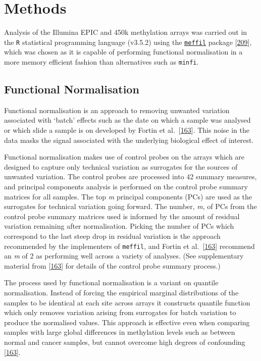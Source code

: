 \documentclass[
]{book}
\begin{document}
\hypertarget{methods-1}{%
\section{Methods}\label{methods-1}}

Analysis of the Illumina EPIC and 450k methylation arrays was carried out in the \texttt{R} statistical programming language (v3.5.2) using the \href{https://github.com/perishky/meffil/wiki}{\texttt{meffil}} package {[}\protect\hyperlink{ref-Min2017}{209}{]}, which was chosen as it is capable of performing functional normalisation in a more memory efficient fashion than alternatives such as \texttt{minfi}.

\hypertarget{functional-normalisation}{%
\subsection{Functional Normalisation}\label{functional-normalisation}}

Functional normalisation is an approach to removing unwanted variation associated with `batch' effects such as the date on which a sample was analysed or which slide a sample is on developed by Fortin et al.~{[}\protect\hyperlink{ref-Fortin2014}{163}{]}.
This noise in the data masks the signal associated with the underlying biological effect of interest.

Functional normalisation makes use of control probes on the arrays which are designed to capture only technical variation as surrogates for the sources of unwanted variation.
The control probes are processed into 42 summary measures, and principal components analysis is performed on the control probe summary matrices for all samples.
The top \emph{m} principal components (PCs) are used as the surrogates for technical variation going forward.
The number, \emph{m}, of PCs from the control probe summary matrices used is informed by the amount of residual variation remaining after normalisation.
Picking the number of PCs which correspond to the last steep drop in residual variation is the approach recommended by the implementers of \texttt{meffil}, and Fortin et al.~{[}\protect\hyperlink{ref-Fortin2014}{163}{]} recommend an \emph{m} of 2 as performing well across a variety of analyses.
(See supplementary material from {[}\protect\hyperlink{ref-Fortin2014}{163}{]} for details of the control probe summary process.)

The process used by functional normalisation is a variant on quantile normalisation.
Instead of forcing the empirical marginal distributions of the samples to be identical at each site across arrays it constructs quantile function which only removes variation arising from surrogates for batch variation to produce the normalised values.
This approach is effective even when comparing samples with large global differences in methylation levels such as between normal and cancer samples, but cannot overcome high degrees of confounding {[}\protect\hyperlink{ref-Fortin2014}{163}{]}.
\end{document}
